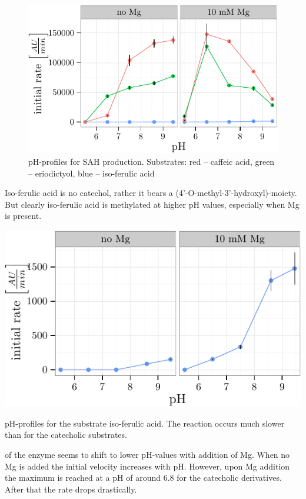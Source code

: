 \documentclass[]{tufte-handout}
\begin{document}
\begin{figure}
 \includegraphics{analysis_tufte_files/figure-latex/unnamed-chunk-4-1.pdf}
\caption{pH-profiles for SAH production. Substrates: red -- caffeic acid, green -- eriodictyol, blue -- iso-ferulic acid}
\end{figure}

Iso-ferulic acid is no catechol, rather it bears a
(4'-O-methyl-3'-hydroxyl)-moiety. But clearly iso-ferulic acid is
methylated at higher pH values, especially when Mg is present.

\begin{marginfigure}
 \includegraphics{analysis_tufte_files/figure-latex/unnamed-chunk-5-1.pdf}
\caption{pH-profiles for the substrate iso-ferulic acid. The reaction occurs much slower than for the catecholic substrates.}
\end{marginfigure}

 of the enzyme seems to shift to lower
pH-values with addition of Mg. When no Mg is added the initial velocity
increases with pH. However, upon Mg addition the maximum is reached at a
pH of around 6.8 for the catecholic derivatives. After that the rate
drops drastically.
\end{document}
